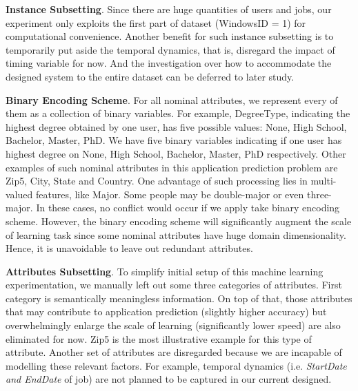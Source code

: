 \documentclass{article} %
\begin{document}
{\bf Instance Subsetting}.
Since there are huge quantities of users and jobs, our experiment only
exploits the first part of dataset (WindowsID = 1) for computational
convenience. Another benefit for such instance subsetting is to temporarily
put aside the temporal dynamics, that is, disregard the impact of timing
variable for now. And the investigation over how to accommodate the designed system
to the entire dataset can be deferred to later study.

{\bf Binary Encoding Scheme}.
For all nominal attributes, we represent every of them as a collection of binary
variables. For example, DegreeType, indicating the highest
degree obtained by one user, has five possible values: None, High
School, Bachelor, Master, PhD. We have five binary variables indicating if one
user has highest degree on None, High School, Bachelor, Master, PhD
respectively. Other examples of such nominal attributes in this application
prediction problem are Zip5, City, State and Country. 
One advantage of such processing lies in multi-valued features, like Major.
Some people may be double-major or even three-major. 
In these cases, no conflict would occur if we apply take binary encoding
scheme. However, the binary encoding scheme will significantly augment the scale of
learning task since some nominal attributes have huge domain dimensionality.
Hence, it is unavoidable to leave out redundant attributes. 

{\bf Attributes Subsetting}.
To simplify initial setup of this machine learning experimentation, we
manually left out some three categories of attributes. First category is
semantically meaningless information. On top of that, those attributes that may contribute to
application prediction (slightly higher accuracy) but overwhelmingly enlarge
the scale of learning (significantly lower speed) are also eliminated for now.
Zip5 is the most illustrative example for this type of attribute.
Another set of attributes are disregarded because we are incapable of
modelling these relevant factors. For example, temporal dynamics (i.e. {\it
    StartDate and EndDate} of job) are not planned to be captured in our
current designed. 
\end{document}
